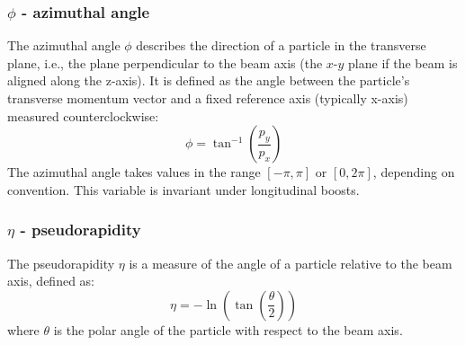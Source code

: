 \subsubsection{$\phi$ - azimuthal angle}
The azimuthal angle $\phi$ describes the direction of a particle in the transverse plane, i.e., the plane perpendicular to the beam axis (the $x\text{-}y$ plane if the beam is aligned along the z-axis).
It is defined as the angle between the particle’s transverse momentum vector and a fixed reference axis (typically x-axis) measured counterclockwise:
\begin{equation}
    \phi = \tan^{-1}\left(\frac{p_y}{p_x}\right)
\end{equation}
The azimuthal angle takes values in the range $[-\pi, \pi]$ or $[0, 2\pi]$, depending on convention.
This variable is invariant under longitudinal boosts.
\subsubsection{$\eta$ - pseudorapidity}
The pseudorapidity $\eta$ is a measure of the angle of a particle relative to the beam axis, defined as:
\begin{equation}
    \eta = -\ln\left(\tan\left(\frac{\theta}{2}\right)\right)
\end{equation}
where $\theta$ is the polar angle of the particle with respect to the beam axis.


